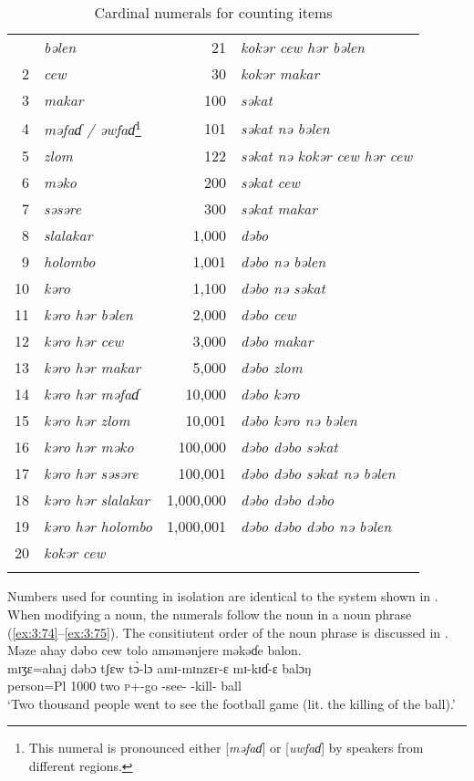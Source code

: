 \begin{table}
\begin{tabular}{rl@{\hspace{4em}}rl}
\lsptoprule
1 & \textit{bəlen} & 21 & \textit{kokər cew hər bəlen}\\
2 & \textit{cew} & 30 & \textit{kokər makar}\\
3 & \textit{makar} & 100 & \textit{səkat}\\
4 & \textit{məfaɗ / əwfaɗ}\footnote{This numeral is pronounced either [\textit{məfaɗ}] or [\textit{uwfaɗ}]  by speakers from different regions.} & 101 & \textit{səkat nə bəlen}\\
5 & \textit{zlom} & 122 & \textit{səkat nə kokər cew hər cew}\\
6 & \textit{məko} & 200 & \textit{səkat cew}\\
7 & \textit{səsəre} & 300 & \textit{səkat makar}\\
8 & \textit{slalakar} & 1,000 & \textit{dəbo}\\
9 & \textit{holombo} & 1,001 & \textit{dəbo nə bəlen}\\
10 & \textit{kəro} & 1,100 & \textit{dəbo  nə səkat}\\
11 & \textit{kəro hər bəlen} & 2,000 & \textit{dəbo cew}\\
12 & \textit{kəro hər cew} & 3,000 & \textit{dəbo makar}\\
13 & \textit{kəro hər makar} & 5,000 & \textit{dəbo zlom}\\
14 & \textit{kəro hər məfaɗ} & 10,000 & \textit{dəbo kəro}\\
15 & \textit{kəro hər zlom} & 10,001 & \textit{dəbo kəro nə bəlen}\\
16 & \textit{kəro hər məko} & 100,000 & \textit{dəbo dəbo səkat}\\
17 & \textit{kəro hər səsəre} & 100,001 & \textit{dəbo dəbo səkat nə bəlen}\\
18 & \textit{kəro hər slalakar} & 1,000,000 & \textit{dəbo dəbo dəbo}\\
19 & \textit{kəro hər holombo} & 1,000,001 & \textit{dəbo dəbo dəbo nə bəlen}\\
20 & \textit{kokər cew} &  & \\
\lspbottomrule
\end{tabular}

\caption{\label{tab:3.21}Cardinal numerals for counting items}
\end{table}

Numbers used for counting in isolation are identical to the system shown in . When modifying a noun, the numerals follow the noun in a noun phrase (\ref{ex:3:74}--\ref{ex:3:75}). The consitiutent order of the noun phrase is discussed in .
\clearpage
\ea \label{ex:3:74}
Məze  ahay  dəbo  cew  tolo  aməmənjere  məkəɗe  balon.\\
\gll  mɪʒɛ=ahaj  dəbɔ   tʃɛw  t\`{ɔ}-lɔ    amɪ-mɪnzɛr-ɛ  mɪ-kɪɗ-ɛ    balɔŋ\\
      person=Pl  1000  two  \textsc{p}+{\PFV}-go  {\DEP}-see-{\CL}  {\NOM}-kill-{\CL}  ball\\
\glt  ‘Two thousand people went to see the football game (lit. the killing of the ball).’
\z

